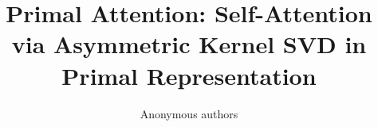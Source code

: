 \title{\textbf{Primal Attention: Self-Attention via Asymmetric Kernel SVD in Primal Representation}}

\author{Anonymous authors}
